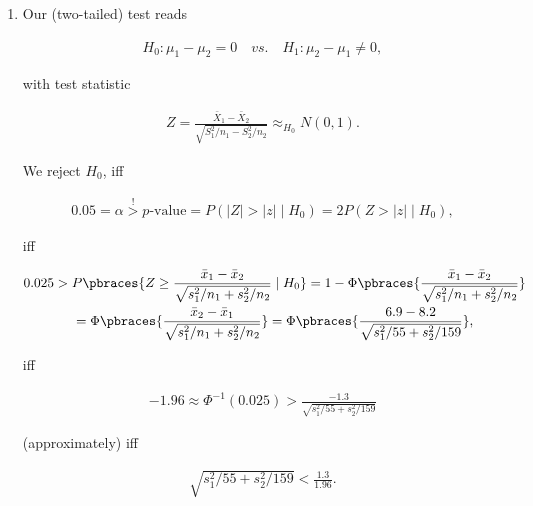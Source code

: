 \begin{solution}
\begin{enumerate}[label = (\alph*)]
    \item Our (two-tailed) test reads
    
    \begin{align*}
        H_0: \mu_1 - \mu_2 = 0
        \quad
        \textit{vs.}
        \quad
        H_1: \mu_2 - \mu_1 \neq 0,
    \end{align*}

    with test statistic

    \begin{align*}
        Z = \frac{\bar X_1 - \bar X_2}{\sqrt{S_1^2 / n_1 - S_2^2 / n_2}} \approx_{H_0} N(0, 1).
    \end{align*}

    We reject $H_0$, iff

    \begin{align*}
        0.05
        =
        \alpha
        \stackrel{!}{>}
        \text{$p$-value}
        =
        P(|Z| > |z| \mid H_0)
        =
        2 P(Z > |z| \mid H_0),
    \end{align*}

    iff

    \begin{multline*}
        0.025
        >
        P \pbraces{Z \geq \frac{\bar x_1 - \bar x_2}{\sqrt{s_1^2 / n_1 + s_2^2 / n_2}} \mid H_0}
        =
        1 - \Phi \pbraces{\frac{\bar x_1 - \bar x_2}{\sqrt{s_1^2 / n_1 + s_2^2 / n_2}}} \\
        =
        \Phi \pbraces{\frac{\bar x_2 - \bar x_1}{\sqrt{s_1^2 / n_1 + s_2^2 / n_2}}}
        =
        \Phi \pbraces{\frac{6.9 - 8.2}{\sqrt{s_1^2 / 55 + s_2^2 / 159}}},
    \end{multline*}

    iff

    \begin{align*}
        -1.96
        \approx
        \Phi^{-1}(0.025)
        >
        \frac{-1.3}{\sqrt{s_1^2 / 55 + s_2^2 / 159}}
    \end{align*}

    (approximately) iff

    \begin{align*}
        \sqrt{s_1^2 / 55 + s_2^2 / 159}
        <
        \frac{1.3}{1.96}.
    \end{align*}

\end{enumerate}

\end{solution}

